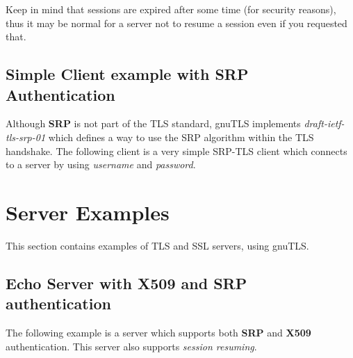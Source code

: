 \documentclass{article}
\begin{document}
\par
Keep in mind that sessions are expired after some time (for security reasons), thus
it may be normal for a server not to resume a session even if you requested that.



\subsection{Simple Client example with SRP Authentication}
Although {\bf SRP} is not part of the TLS standard, gnuTLS implements
{\it draft-ietf-tls-srp-01} which defines a way to use the SRP algorithm
within the TLS handshake. The following client
is a very simple SRP-TLS client which connects to a server by using 
{\it username} and {\it password}.



\section{Server Examples}
This section contains examples of TLS and SSL servers, using gnuTLS.

\subsection{Echo Server with X509 and SRP authentication}
The following example is a server which supports both {\bf SRP} and {\bf X509} authentication.
This server also supports {\it session resuming}.



\end{document}
